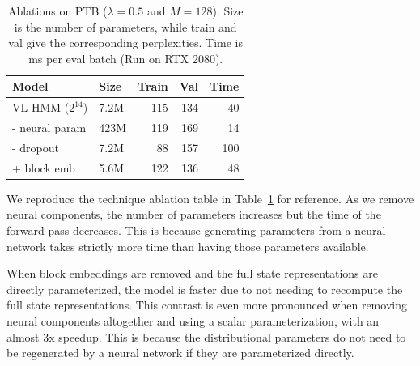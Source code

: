 \documentclass[11pt,a4paper]{article}
\begin{document}
\begin{table}[t]
\centering
\begin{tabular}{llrrr}
\toprule
Model                & Size & Train  & Val & Time \\
\midrule
VL-HMM ($2^{14}$)    & 7.2M & 115    & 134 & 40\\
\quad - neural param & 423M & 119    & 169 & 14\\
\quad - dropout      & 7.2M & 88     & 157 & 100\\
\quad + block emb    & 5.6M & 122    & 136 & 48\\
\bottomrule
\end{tabular}
\caption{\label{tbl:dropout-param-ablation-repeat}
Ablations on \textsc{PTB} ($\lambda =0.5$ and $M=128$). Size is the number of parameters, while train and val give the corresponding perplexities.
Time is ms per eval batch (Run on RTX 2080).
}
\end{table}

We reproduce the technique ablation table in
Table~\ref{tbl:dropout-param-ablation-repeat} for reference.
As we remove neural components, 
the number of parameters increases but the time of the
forward pass decreases.
This is because generating parameters from a neural network
takes strictly more time than having those parameters available.

When block embeddings are removed and the full state representations are
directly parameterized,
the model is faster due to not needing to recompute the full state representations.
This contrast is even more pronounced when removing neural components altogether and using a scalar parameterization, with an almost 3x speedup. This is because the distributional parameters do not need to be regenerated by a neural network if they are parameterized directly.
    
\end{document}
